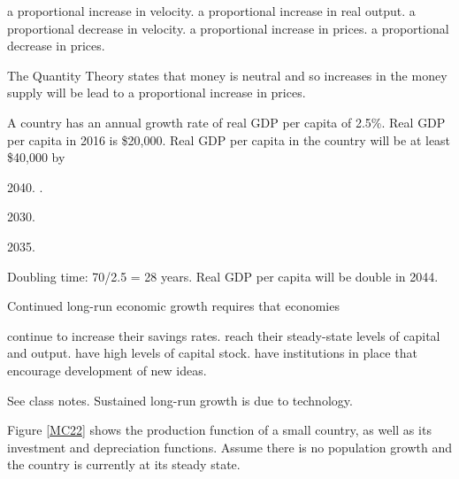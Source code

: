 \documentclass[addpoints,11pt]{exam}
\theoremstyle{definition}
\begin{document}
\begin{questions}
\begin{choices}
	\choice a proportional increase in velocity.
	\choice a proportional increase in real output.
	\choice a proportional decrease in velocity.
	\CorrectChoice a proportional increase in prices.
	\choice a proportional decrease in prices.
\end{choices}

\begin{solution} 
	The Quantity Theory states that money is neutral and so increases in the money supply will be lead to a proportional increase in prices.
\end{solution}

\newpage	
	
\question A country has an annual growth rate of real GDP per capita of 2.5\%. Real GDP per capita in 2016 is \$20,000. Real GDP per capita in the country will be at least \$40,000 by
	
		\begin{choices}
			\item 2040.
			.
			\item 2030.
			\item 2035.
		\end{choices}
		
	\begin{solution} 
		Doubling time: 70/2.5 = 28 years. Real GDP per capita will be double in 2044.
	\end{solution}
	

	
\question Continued long-run economic growth requires that economies
		
		\begin{choices}
			\choice continue to increase their savings rates.
			\choice reach their steady-state levels of capital and output.
			\choice have high levels of capital stock.
			\CorrectChoice have institutions in place that encourage development of new ideas.
		\end{choices}
		
		\begin{solution} 
			See class notes. Sustained long-run growth is due to technology.
		\end{solution}

	\question Figure \ref{MC22} shows the production function of a small country, as well as its investment and depreciation functions. Assume there is no population growth and the country is currently at its steady state.
	

\end{questions}
\end{document}
